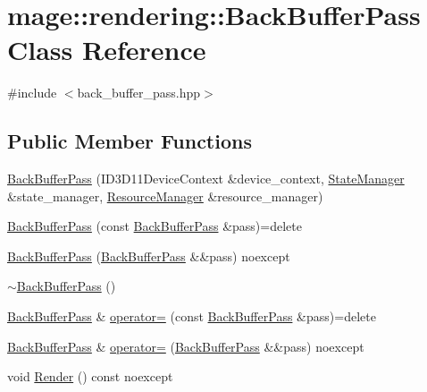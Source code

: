 \hypertarget{classmage_1_1rendering_1_1_back_buffer_pass}{}\section{mage\+:\+:rendering\+:\+:Back\+Buffer\+Pass Class Reference}
\label{classmage_1_1rendering_1_1_back_buffer_pass}


{\ttfamily \#include $<$back\+\_\+buffer\+\_\+pass.\+hpp$>$}

\subsection*{Public Member Functions}
\begin{DoxyCompactItemize}
\item 
\hyperlink{classmage_1_1rendering_1_1_back_buffer_pass_a054aad27e4b3d05baf235ae256934ef2}{Back\+Buffer\+Pass} (I\+D3\+D11\+Device\+Context \&device\+\_\+context, \hyperlink{classmage_1_1rendering_1_1_state_manager}{State\+Manager} \&state\+\_\+manager, \hyperlink{classmage_1_1rendering_1_1_resource_manager}{Resource\+Manager} \&resource\+\_\+manager)
\item 
\hyperlink{classmage_1_1rendering_1_1_back_buffer_pass_aa8042001dccc96e61b01a5775421a41d}{Back\+Buffer\+Pass} (const \hyperlink{classmage_1_1rendering_1_1_back_buffer_pass}{Back\+Buffer\+Pass} \&pass)=delete
\item 
\hyperlink{classmage_1_1rendering_1_1_back_buffer_pass_ac8dfbaabb766f4bfd61cfea8d01dd7dc}{Back\+Buffer\+Pass} (\hyperlink{classmage_1_1rendering_1_1_back_buffer_pass}{Back\+Buffer\+Pass} \&\&pass) noexcept
\item 
\hyperlink{classmage_1_1rendering_1_1_back_buffer_pass_a697a5e094cdcdf9f42dd2efdda957b57}{$\sim$\+Back\+Buffer\+Pass} ()
\item 
\hyperlink{classmage_1_1rendering_1_1_back_buffer_pass}{Back\+Buffer\+Pass} \& \hyperlink{classmage_1_1rendering_1_1_back_buffer_pass_acad71e5633ba37b1069c5a2ef9e6f704}{operator=} (const \hyperlink{classmage_1_1rendering_1_1_back_buffer_pass}{Back\+Buffer\+Pass} \&pass)=delete
\item 
\hyperlink{classmage_1_1rendering_1_1_back_buffer_pass}{Back\+Buffer\+Pass} \& \hyperlink{classmage_1_1rendering_1_1_back_buffer_pass_a79649b9316cb114bae032027406b4fe4}{operator=} (\hyperlink{classmage_1_1rendering_1_1_back_buffer_pass}{Back\+Buffer\+Pass} \&\&pass) noexcept
\item 
void \hyperlink{classmage_1_1rendering_1_1_back_buffer_pass_a525b9fa3309cb5a2c8ff5ed24011695a}{Render} () const noexcept
\end{DoxyCompactItemize}
